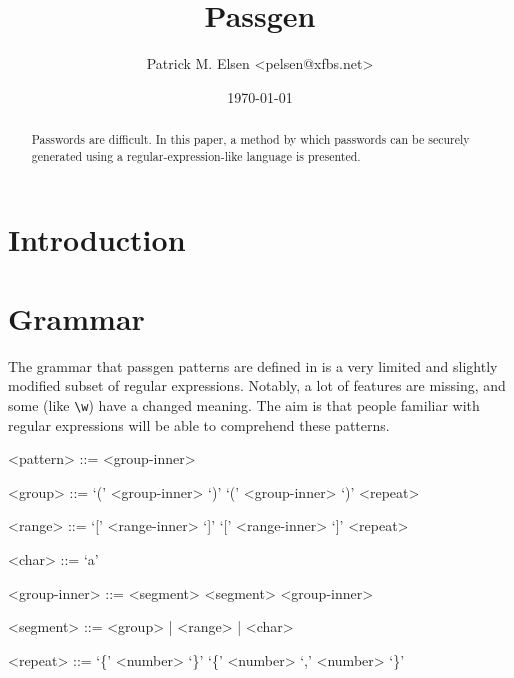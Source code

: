 \documentclass[a4paper,twocolumn]{article}
\title{Passgen}
\author{Patrick M. Elsen <pelsen@xfbs.net>}
\date{\today}
\begin{document}
\maketitle
\begin{abstract}
  Passwords are difficult. In this paper, a method by which passwords can be securely generated using a regular-expression-like language is presented.
\end{abstract}

\tableofcontents

\section{Introduction}



\section{Grammar}

The grammar that passgen patterns are defined in is a very limited and slightly modified subset of regular expressions. Notably, a lot of features are missing, and some (like \verb|\w|) have a changed meaning. The aim is that people familiar with regular expressions will be able to comprehend these patterns.

\setlength{\grammarindent}{4em}
\begin{grammar}

<pattern> ::= <group-inner>

<group> ::= ‘(’ <group-inner> ‘)’ \alt ‘(’ <group-inner> ‘)’ <repeat>

<range> ::= ‘[’ <range-inner> ‘]’ \alt ‘[’ <range-inner> ‘]’ <repeat>

<char> ::= ‘a’

<group-inner> ::= <segment> \alt <segment> <group-inner>

<segment> ::= <group> | <range> | <char>

<repeat> ::= ‘\{’ <number> ‘\}’ \alt ‘\{’ <number> ‘,’ <number> ‘\}’

\end{grammar}
\end{document}
